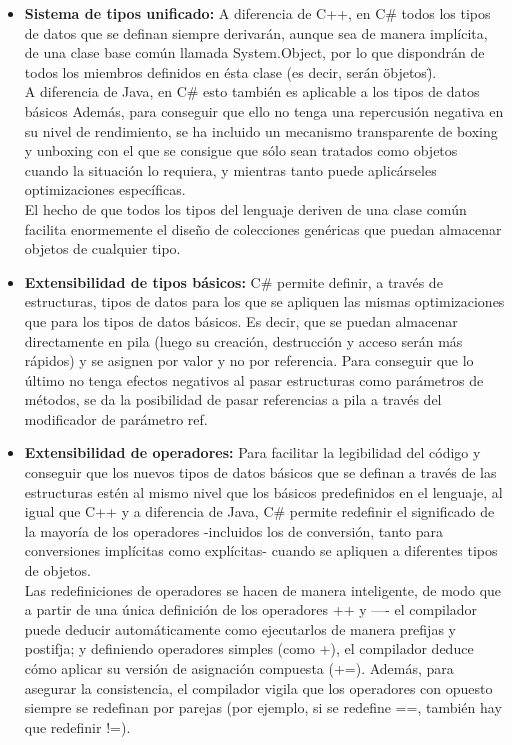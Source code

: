 \begin{itemize}
	\item \textbf{Sistema de tipos unificado: } A diferencia de C++, en C\# todos los tipos de datos que se definan siempre derivar\'an, aunque sea de manera impl\'icita, de una clase base com\'un llamada System.Object, por lo que dispondr\'an de todos los miembros definidos en \'esta clase (es decir, ser\'an \" objetos\").\\

	A diferencia de Java, en C\# esto tambi\'en es aplicable a los tipos de datos b\'asicos Adem\'as, para conseguir que ello no tenga una repercusi\'on negativa en su nivel de rendimiento, se ha incluido un mecanismo transparente de boxing y unboxing con el que se consigue que s\'olo sean tratados como objetos cuando la situaci\'on lo requiera, y mientras tanto puede aplic\'arseles optimizaciones espec\'ificas.\\

	El hecho de que todos los tipos del lenguaje deriven de una clase com\'un facilita enormemente el dise\~no de colecciones gen\'ericas que puedan almacenar objetos de cualquier tipo. 

	\item \textbf{Extensibilidad de tipos b\'asicos: }  C\# permite definir, a trav\'es de estructuras, tipos de datos para los que se apliquen las mismas optimizaciones que para los tipos de datos b\'asicos. Es decir, que se puedan almacenar directamente en pila (luego su creaci\'on, destrucci\'on y acceso ser\'an m\'as r\'apidos) y se asignen por valor y no por referencia. Para conseguir que lo \'ultimo no tenga efectos negativos al pasar estructuras como par\'ametros de m\'etodos, se da la posibilidad de pasar referencias a pila a trav\'es del modificador de par\'ametro ref. 

	\item \textbf{Extensibilidad de operadores: } Para facilitar la legibilidad del c\'odigo y conseguir que los nuevos tipos de datos b\'asicos que se definan a trav\'es de las estructuras est\'en al mismo nivel que los b\'asicos predefinidos en el lenguaje, al igual que C++ y a diferencia de Java, C\# permite redefinir el significado de la mayor\'ia de los operadores -incluidos los de conversi\'on, tanto para conversiones impl\'icitas como expl\'icitas- cuando se apliquen a diferentes tipos de objetos.\\

	Las redefiniciones de operadores se hacen de manera inteligente, de modo que a partir de una \'unica definici\'on de los operadores ++ y ---- el compilador puede deducir autom\'aticamente como ejecutarlos de manera prefijas y postifja; y definiendo operadores simples (como +), el compilador deduce c\'omo aplicar su versi\'on de asignaci\'on compuesta (+=). Adem\'as, para asegurar la consistencia, el compilador vigila que los operadores con opuesto siempre se redefinan por parejas (por ejemplo, si se redefine ==, tambi\'en hay que redefinir !=).\\


\end{itemize}
